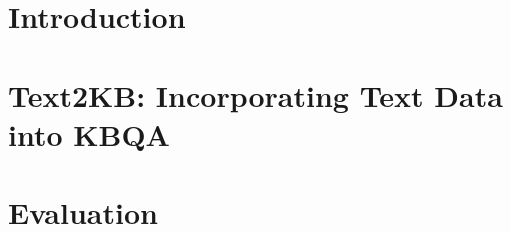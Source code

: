 \documentclass{sig-alternate-05-2015}
\begin{document}
%

%
%
%
%



\section{Introduction}
\label{section:intro}


%

\section{Text2KB: Incorporating Text Data into KBQA}
\label{section:method}


\section{Evaluation}
\label{section:eval}

\end{document}
